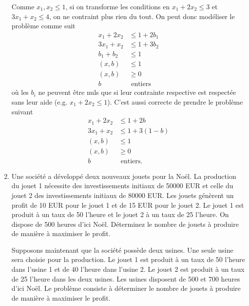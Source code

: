 \begin{enumerate}
    \begin{solution}
      Comme $x_1,x_2 \leq 1$, si on transforme les conditions en
      $x_1 + 2x_2 \leq 3$ et $3x_1 + x_2 \leq 4$,
      on ne contraint plus rien du tout.
      On peut donc modéliser le problème comme suit
      \begin{align*}
        x_1 + 2x_2 & \leq 1 + 2b_1\\
        3x_1 + x_2 & \leq 1 + 3b_2\\
        b_1 + b_2 & \leq 1\\
        (x,b) & \leq 1\\
        (x,b) & \geq 0\\
        b & \text{ entiers}
      \end{align*}
      où les $b_i$ ne peuvent être nuls que si leur contrainte respective
      est respectée sans leur aide (e.g. $x_1 + 2x_2 \leq 1$).
      C'est aussi correcte de prendre le problème suivant
      \begin{align*}
        x_1 + 2x_2 & \leq 1 + 2b\\
        3x_1 + x_2 & \leq 1 + 3(1-b)\\
        (x,b) & \leq 1\\
        (x,b) & \geq 0\\
        b & \text{ entiers}.
      \end{align*}
    \end{solution}

  \item Une société a développé deux nouveaux jouets pour la Noël. La production du jouet 1 nécessite des investissements initiaux de
    50000 EUR et celle du jouet 2 des investissements initiaux de 80000 EUR. Les jouets
    génèrent un profit de 10 EUR pour le jouet 1 et de 15 EUR pour le jouet 2.  Le jouet 1 est
    produit à un taux de 50 l'heure et le jouet 2 à un taux de 25 l'heure. On dispose  de 500 heures
    d'ici Noël. Déterminez le nombre de jouets à produire de manière à maximiser le profit.


    Supposons maintenant que la société possède deux usines. Une seule usine sera choisie pour la production. Le
    jouet 1 est produit à un taux de 50 l'heure dans l'usine 1 et de 40 l'heure dans l'usine 2. Le jouet 2 est produit à un taux de
    25 l'heure dans les deux usines. Les usines disposent de 500 et 700 heures d'ici Noël.  Le problème consiste à déterminer le
    nombre de jouets à produire de manière à maximiser le profit.

    \begin{solution}
      \nosolution
    \end{solution}


\end{enumerate}
